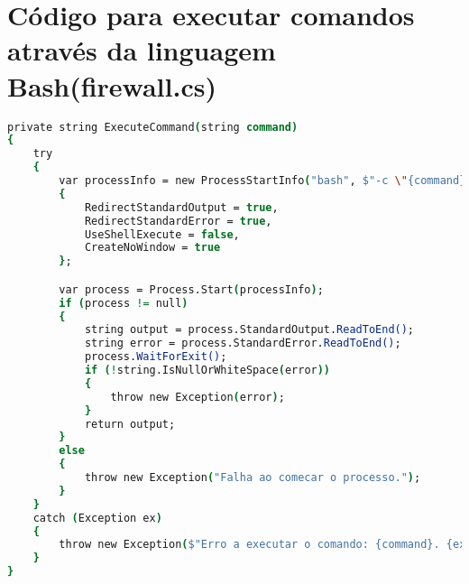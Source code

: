 
\chapter{Código para executar comandos através da linguagem Bash(firewall.cs)}
\label{chap:zb}

\begin{lstlisting}[language=csh, caption={Função que executa comandos na shell}]
private string ExecuteCommand(string command)
{
    try
    {
        var processInfo = new ProcessStartInfo("bash", $"-c \"{command}\"")
        {
            RedirectStandardOutput = true,
            RedirectStandardError = true,
            UseShellExecute = false,
            CreateNoWindow = true
        };

        var process = Process.Start(processInfo);
        if (process != null)
        {
            string output = process.StandardOutput.ReadToEnd();
            string error = process.StandardError.ReadToEnd();
            process.WaitForExit();
            if (!string.IsNullOrWhiteSpace(error))
            {
                throw new Exception(error);
            }
            return output;
        }
        else
        {
            throw new Exception("Falha ao comecar o processo.");
        }
    }
    catch (Exception ex)
    {
        throw new Exception($"Erro a executar o comando: {command}. {ex.Message}");
    }
}
\end{lstlisting} 